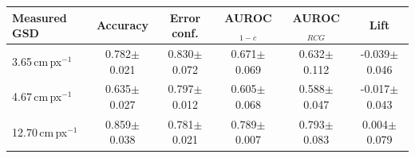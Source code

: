 \begin{tabular}{lccccc}
\toprule
Measured GSD & Accuracy & Error conf. & AUROC$_{1-c}$ & AUROC$_{RCG}$ & Lift \\
\midrule
3.65\,cm\,px$^{-1}$ & 0.782$\pm$0.021 & 0.830$\pm$0.072 & 0.671$\pm$0.069 & 0.632$\pm$0.112 & -0.039$\pm$0.046 \\
4.67\,cm\,px$^{-1}$ & 0.635$\pm$0.027 & 0.797$\pm$0.012 & 0.605$\pm$0.068 & 0.588$\pm$0.047 & -0.017$\pm$0.043 \\
12.70\,cm\,px$^{-1}$ & 0.859$\pm$0.038 & 0.781$\pm$0.021 & 0.789$\pm$0.007 & 0.793$\pm$0.083 & 0.004$\pm$0.079 \\
\bottomrule
\end{tabular}
